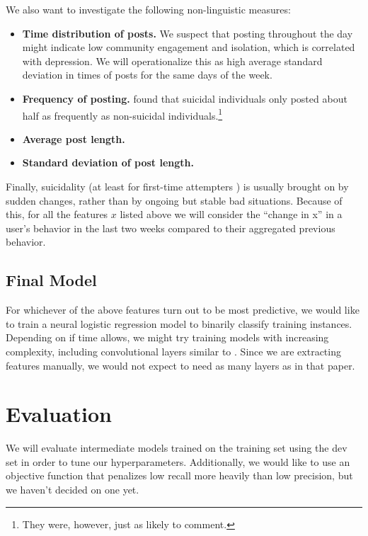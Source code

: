 \documentclass[11pt,letterpaper]{article}
\newcommand{\3}{$|$}
\newcommand{\Bf}{\textbf}
\begin{document}
We also want to investigate the following non-linguistic measures:
\begin{itemize}
\item \Bf{Time distribution of posts.} We suspect that posting throughout the day might indicate low community engagement and isolation, which is correlated with depression. We will operationalize this as high average standard deviation in times of posts for the same days of the week.
\item \Bf{Frequency of posting.} \citet{deChoudhury16} found that suicidal individuals only posted about half as frequently as non-suicidal individuals.\footnote{They were, however, just as likely to comment.}
\item \Bf{Average post length.} 
\item \Bf{Standard deviation of post length.}
\end{itemize}
Finally, suicidality (at least for first-time attempters \citep{witte05}) is usually brought on by sudden changes, rather than by ongoing but stable bad situations. Because of this, for all the features $x$ listed above we will consider the ``change in x'' in a user's behavior in the last two weeks compared to their aggregated previous behavior. 

\subsection{Final Model}

For whichever of the above features turn out to be most predictive, we would like to train a neural logistic regression model to binarily classify training instances. Depending on if time allows, we might try training models with increasing complexity, including convolutional layers similar to \citet{yates17}. Since we are extracting features manually, we would not expect to need as many layers as in that paper.

\section{Evaluation}
We will evaluate intermediate models trained on the training set using the dev set in order to tune our hyperparameters. Additionally, we would like to use an objective function that penalizes low recall more heavily than low precision, but we haven't decided on one yet. 


\end{document}
